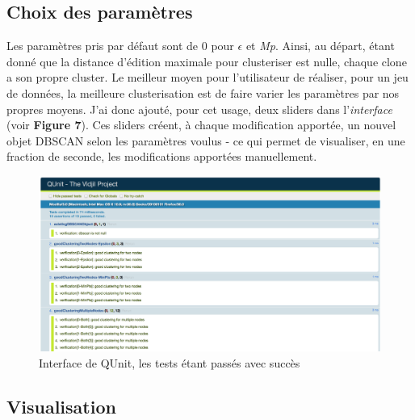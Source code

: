 \documentclass[pdftex,12pt,a4paper]{report}
\begin{document}
\begin{spacing}{1.2}
\subsection{Choix des paramètres}

Les paramètres pris par défaut sont de 0 pour $\epsilon$ et \textit{Mp}. Ainsi, au départ, étant donné que la distance d'édition maximale pour clusteriser est nulle, chaque clone a son propre cluster.
\newline
Le meilleur moyen pour l'utilisateur de réaliser, pour un jeu de données, la meilleure clusterisation est de faire varier les paramètres par nos propres moyens.
J'ai donc ajouté, pour cet usage, deux sliders dans l'\textit{interface} (voir \textbf{Figure 7}).
Ces sliders créent, à chaque modification apportée, un nouvel objet DBSCAN selon les paramètres voulus - ce qui permet de visualiser, en une fraction de seconde, les modifications apportées manuellement.

\begin{figure}[H]
\begin{center}
	\includegraphics[scale=0.35]{img/QUnit.jpg}
\end{center}
\caption{Interface de QUnit, les tests étant passés avec succès}
\end{figure}

\subsection{Visualisation}


\end{spacing}
\end{document}
